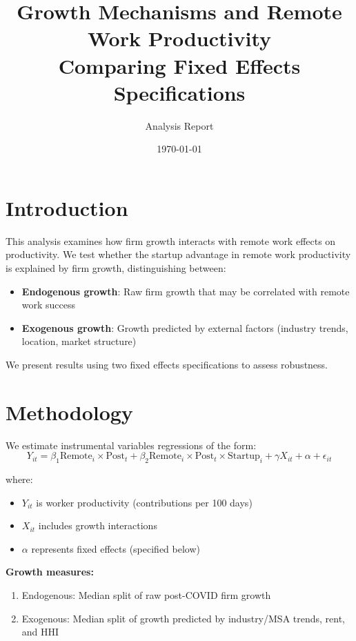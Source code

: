 \documentclass[11pt]{article}
\title{Growth Mechanisms and Remote Work Productivity\\
\large Comparing Fixed Effects Specifications}
\author{Analysis Report}
\date{\today}
\begin{document}
\maketitle

\section{Introduction}

This analysis examines how firm growth interacts with remote work effects on productivity. We test whether the startup advantage in remote work productivity is explained by firm growth, distinguishing between:
\begin{itemize}
\item \textbf{Endogenous growth}: Raw firm growth that may be correlated with remote work success
\item \textbf{Exogenous growth}: Growth predicted by external factors (industry trends, location, market structure)
\end{itemize}

We present results using two fixed effects specifications to assess robustness.

\section{Methodology}

We estimate instrumental variables regressions of the form:
\begin{equation}
Y_{it} = \beta_1 \text{Remote}_i \times \text{Post}_t + \beta_2 \text{Remote}_i \times \text{Post}_t \times \text{Startup}_i + \gamma X_{it} + \alpha + \epsilon_{it}
\end{equation}

where:
\begin{itemize}
\item $Y_{it}$ is worker productivity (contributions per 100 days)
\item $X_{it}$ includes growth interactions
\item $\alpha$ represents fixed effects (specified below)
\end{itemize}

\textbf{Growth measures:}
\begin{enumerate}
\item Endogenous: Median split of raw post-COVID firm growth
\item Exogenous: Median split of growth predicted by industry/MSA trends, rent, and HHI
\end{enumerate}
\end{document}
